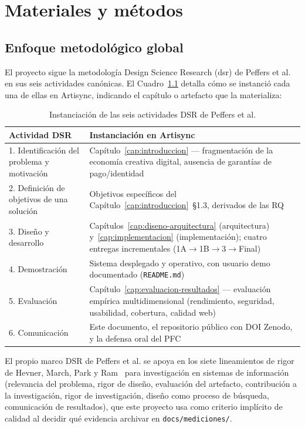 
\chapter{Materiales y métodos}
\label{cap:materiales-metodos}

\section{Enfoque metodológico global}

El proyecto sigue la metodología Design Science Research (\gls{dsr}) de
Peffers et al.~\cite{PEFFERS2007} en sus seis actividades canónicas. El
Cuadro~\ref{tab:dsr} detalla cómo se instanció cada una de ellas en
Artisync, indicando el capítulo o artefacto que la materializa:

\begin{table}[H]
\centering
\caption{Instanciación de las seis actividades DSR de Peffers et al.}
\label{tab:dsr}
\begin{tabular}{@{}p{4.6cm}p{9.4cm}@{}}
\toprule
\textbf{Actividad DSR} & \textbf{Instanciación en Artisync} \\
\midrule
1. Identificación del problema y motivación & Capítulo~\ref{cap:introduccion}
  --- fragmentación de la economía creativa digital, ausencia de
  garantías de pago/identidad \\
2. Definición de objetivos de una solución & Objetivos específicos del
  Capítulo~\ref{cap:introduccion}~\S1.3, derivados de las RQ \\
3. Diseño y desarrollo & Capítulos~\ref{cap:diseno-arquitectura}
  (arquitectura) y~\ref{cap:implementacion} (implementación); cuatro
  entregas incrementales (1A$\to$1B$\to$3$\to$Final) \\
4. Demostración & Sistema desplegado y operativo, con usuario demo
  documentado (\texttt{README.md}) \\
5. Evaluación & Capítulo~\ref{cap:evaluacion-resultados} --- evaluación
  empírica multidimensional (rendimiento, seguridad, usabilidad,
  cobertura, calidad web) \\
6. Comunicación & Este documento, el repositorio público con DOI Zenodo, y
  la defensa oral del PFC \\
\bottomrule
\end{tabular}
\end{table}

El propio marco DSR de Peffers et al. se apoya en los siete lineamientos
de rigor de Hevner, March, Park y Ram~\cite{HEVNER2004} para investigación
en sistemas de información (relevancia del problema, rigor de diseño,
evaluación del artefacto, contribución a la investigación, rigor de
investigación, diseño como proceso de búsqueda, comunicación de
resultados), que este proyecto usa como criterio implícito de calidad al
decidir qué evidencia archivar en \texttt{docs/mediciones/}.

